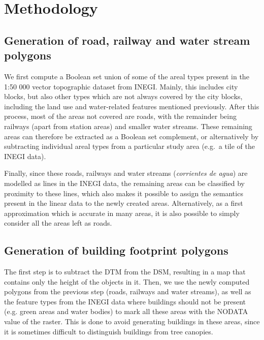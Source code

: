 \documentclass{isprs} %
\begin{document}
\section{Methodology}
\label{sec:methodology}


\subsection{Generation of road, railway and water stream polygons}

We first compute a Boolean set union of some of the areal types present in the 1:50 000 vector topographic dataset from INEGI.
Mainly, this includes city blocks, but also other types which are not always covered by the city blocks, including the land use and water-related features mentioned previously.
After this process, most of the areas not covered are roads, with the remainder being railways (apart from station areas) and smaller water streams.
These remaining areas can therefore be extracted as a Boolean set complement, or alternatively by subtracting individual areal types from a particular study area (e.g.\ a tile of the INEGI data).

Finally, since these roads, railways and water streams (\emph{corrientes de agua}) are modelled as lines in the INEGI data, the remaining areas can be classified by proximity to these lines, which also makes it possible to assign the semantics present in the linear data to the newly created areas.
Alternatively, as a first approximation which is accurate in many areas, it is also possible to simply consider all the areas left as roads.

\subsection{Generation of building footprint polygons}

The first step is to subtract the DTM from the DSM, resulting in a map that contains only the height of the objects in it.
Then, we use the newly computed polygons from the previous step (roads, railways and water streams), as well as the feature types from the INEGI data where buildings should not be present (e.g. green areas and water bodies) to mark all these areas with the NODATA value of the raster.
This is done to avoid generating buildings in these areas, since it is sometimes difficult to distinguish buildings from tree canopies.
\end{document}
